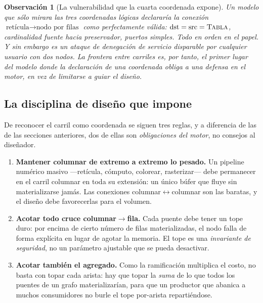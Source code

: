 \documentclass[11pt,a4paper]{article}
\theoremstyle{definition}
\theoremstyle{plain}
\newtheorem{observacion}{Observación}[section]
\newcommand{\mundo}[1]{\textsc{#1}}   %
\begin{document}
\begin{observacion}[La vulnerabilidad que la cuarta coordenada expone]
Un modelo que sólo mirara las tres coordenadas lógicas declararía la conexión
$\text{retícula}\to\text{nodo por filas}$ como perfectamente válida:
$\operatorname{dst}=\operatorname{src}=\mundo{Tabla}$, cardinalidad fuente hacia
preservador, puertos simples. Todo en orden en el papel. Y sin embargo es un ataque
de denegación de servicio disparable por cualquier usuario con dos nodos. La
frontera entre carriles es, por tanto, el primer lugar del modelo donde la
declaración de una coordenada \emph{obliga} a una defensa en el motor, en vez de
limitarse a guiar el diseño.
\end{observacion}

\subsection{La disciplina de diseño que impone}

De reconocer el carril como coordenada se siguen tres reglas, y a diferencia de las
de las secciones anteriores, dos de ellas son \emph{obligaciones del motor}, no
consejos al diseñador.

\begin{enumerate}[leftmargin=1.6em]
  \item \textbf{Mantener columnar de extremo a extremo lo pesado.} Un pipeline
        numérico masivo ---retícula, cómputo, colorear, rasterizar--- debe permanecer
        en el carril columnar en toda su extensión: un único búfer que fluye sin
        materializarse jamás. Las conexiones columnar$\leftrightarrow$columnar son las
        baratas, y el diseño debe favorecerlas para el volumen.
  \item \textbf{Acotar todo cruce columnar$\to$fila.} Cada puente debe tener un tope
        duro: por encima de cierto número de filas materializadas, el nodo falla de
        forma explícita en lugar de agotar la memoria. El tope es una \emph{invariante
        de seguridad}, no un parámetro ajustable que se pueda desactivar.
  \item \textbf{Acotar también el agregado.} Como la ramificación multiplica el costo,
        no basta con topar cada arista: hay que topar la \emph{suma} de lo que todos
        los puentes de un grafo materializarían, para que un productor que abanica a
        muchos consumidores no burle el tope por-arista repartiéndose.
\end{enumerate}
\end{document}
